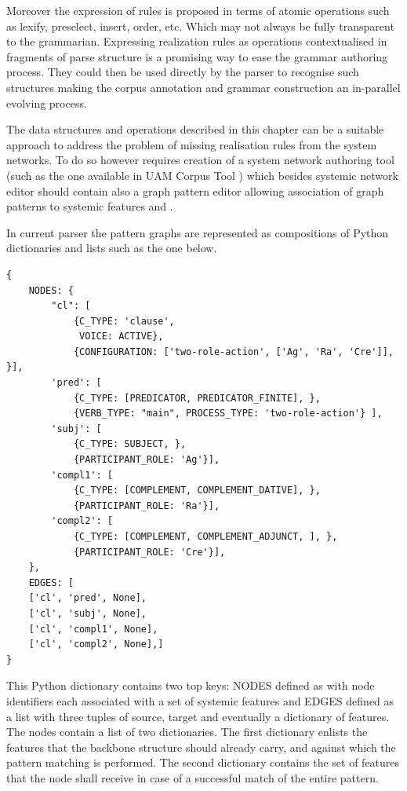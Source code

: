 Moreover the expression of rules is proposed in terms of atomic operations such as lexify, preselect, insert, order, etc. Which may not always be fully transparent to the grammarian. Expressing realization rules as operations contextualised in fragments of parse structure is a promising way to ease the grammar authoring process. They could then be used directly by the parser to recognise such structures making the corpus annotation and grammar construction an in-parallel evolving process.

The data structures and operations described in this chapter can be a suitable approach to address the problem of missing realisation rules from the system networks. To do so however requires creation of a system network authoring tool (such as the one available in UAM Corpus Tool \citep{ODonnell2008a}) which besides systemic network editor should contain also a graph pattern editor allowing association of graph patterns to systemic features and . 

In current parser the pattern graphs are represented as compositions of Python dictionaries and lists such as the one below.
\begin{Verbatim}[fontsize=\relsize{-2}]
{
    NODES: {  
        "cl": [
            {C_TYPE: 'clause', 
             VOICE: ACTIVE},
            {CONFIGURATION: ['two-role-action', ['Ag', 'Ra', 'Cre']], }],
        'pred': [
            {C_TYPE: [PREDICATOR, PREDICATOR_FINITE], }, 
            {VERB_TYPE: "main", PROCESS_TYPE: 'two-role-action'} ],
        'subj': [
            {C_TYPE: SUBJECT, }, 
            {PARTICIPANT_ROLE: 'Ag'}],
        'compl1': [
            {C_TYPE: [COMPLEMENT, COMPLEMENT_DATIVE], },
            {PARTICIPANT_ROLE: 'Ra'}],
        'compl2': [
            {C_TYPE: [COMPLEMENT, COMPLEMENT_ADJUNCT, ], },
            {PARTICIPANT_ROLE: 'Cre'}],
    },
    EDGES: [
    ['cl', 'pred', None], 
    ['cl', 'subj', None], 
    ['cl', 'compl1', None], 
    ['cl', 'compl2', None],]
}
\end{Verbatim}

This Python dictionary contains two top keys: NODES defined as  with node identifiers each associated with a set of systemic features and EDGES defined as a list with three tuples of source, target and eventually a dictionary of features. The nodes contain a list of two dictionaries. The first dictionary enlists the features that the backbone structure should already carry, and against which the pattern matching is performed. The second dictionary contains the set of features that the node shall receive in case of a successful match of the entire pattern. 

